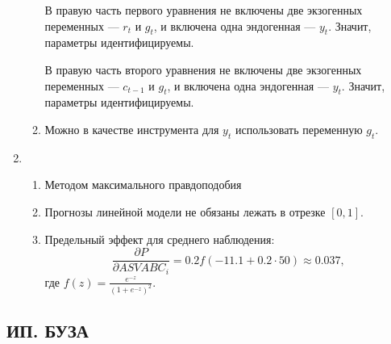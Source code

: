 \documentclass[12pt, a4paper]{article}
\theoremstyle{definition}
\begin{document}
\begin{enumerate}
\begin{enumerate}
В правую часть первого уравнения не включены две экзогенных переменных — $r_t$ и $g_t$,
и включена одна эндогенная — $y_t$.
Значит, параметры идентифицируемы.

В правую часть второго уравнения не включены две экзогенных переменных — $c_{t-1}$ и $g_t$,
и включена одна эндогенная — $y_t$.
Значит, параметры идентифицируемы.

\item

Можно в качестве инструмента для $y_t$ использовать переменную $g_t$.
\end{enumerate}
\item
\begin{enumerate}
\item Методом максимального правдоподобия
\item Прогнозы линейной модели не обязаны лежать в отрезке $[0, 1]$.
\item Предельный эффект для среднего наблюдения:
\[
\frac{\partial P}{\partial ASVABC_i} = 0.2 f(-11.1 + 0.2 \cdot 50) \approx 0.037,
\]
где $f(z) = \frac{e^{-z}}{(1+e^{-z})^2}$.
\end{enumerate}
\end{enumerate}


\subsection{ИП. БУЗА}
\end{document}
